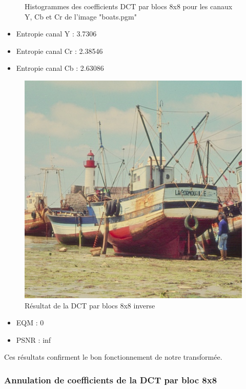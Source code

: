\documentclass[12pt]{report}
\begin{document}
\begin{figure}[H]
\begin{center}
\caption{Histogrammes des coefficients DCT par blocs 8x8 pour les canaux Y, Cb et Cr de l'image "boats.pgm"}
\end{center}
\end{figure}

\begin{itemize}
\item Entropie canal Y : 3.7306
\item Entropie canal Cr : 2.38546
\item Entropie canal Cb : 2.63086
\end{itemize}

\begin{figure}[H]
\begin{center}
\includegraphics[scale=0.5]{../ImageRes/idct_masked2_result.jpg} 
\caption{Résultat de la DCT par blocs 8x8 inverse}
\end{center}
\end{figure}

\begin{itemize}
\item EQM : 0
\item PSNR : inf
\end{itemize}

Ces résultats confirment le bon fonctionnement de notre transformée.

\subsubsection{Annulation de coefficients de la DCT par bloc 8x8}
\end{document}
